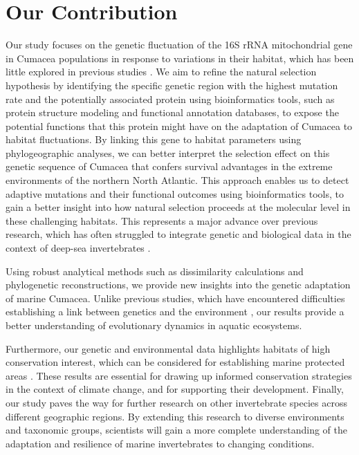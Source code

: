 \section{Our Contribution}\label{contribution}
Our study focuses on the genetic fluctuation of the 16S rRNA mitochondrial gene in Cumacea populations in response to variations in their habitat, which has been little explored in previous studies \citep{grassle1992deep, rex2000latitudinal}. We aim to refine the natural selection hypothesis by identifying the specific genetic region with the highest mutation rate and the potentially associated protein using bioinformatics tools, such as protein structure modeling and functional annotation databases, to expose the potential functions that this protein might have on the adaptation of Cumacea to habitat fluctuations. By linking this gene to habitat parameters using phylogeographic analyses, we can better interpret the selection effect on this genetic sequence of Cumacea that confers survival advantages in the extreme environments of the northern North Atlantic. This approach enables us to detect adaptive mutations and their functional outcomes using bioinformatics tools, to gain a better insight into how natural selection proceeds at the molecular level in these challenging habitats. This represents a major advance over previous research, which has often struggled to integrate genetic and biological data in the context of deep-sea invertebrates \citep{etter1990population, vrijenhoek2009cryptic}.

Using robust analytical methods such as dissimilarity calculations and phylogenetic reconstructions, we provide new insights into the genetic adaptation of marine Cumacea. Unlike previous studies, which have encountered difficulties establishing a link between genetics and the environment \citep{manel2003landscape, balkenhol2009statistical}, our results provide a better understanding of evolutionary dynamics in aquatic ecosystems.

Furthermore, our genetic and environmental data highlights habitats of high conservation interest, which can be considered for establishing marine protected areas \citep{levin2009ecological}. These results are essential for drawing up informed conservation strategies in the context of climate change, and for supporting their development. Finally, our study paves the way for further research on other invertebrate species across different geographic regions. By extending this research to diverse environments and taxonomic groups, scientists will gain a more complete understanding of the adaptation and resilience of marine invertebrates to changing conditions. 

